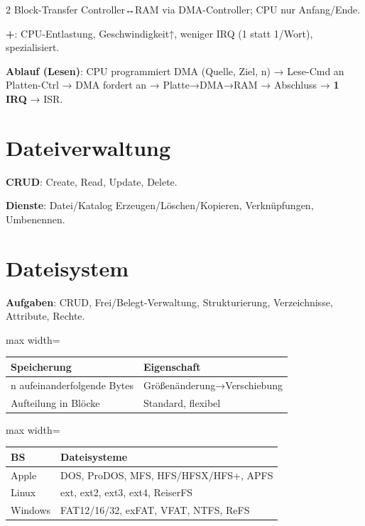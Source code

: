 \documentclass[10pt, a4paper]{article}
\begin{document}
\begin{multicols}{2}
Block-Transfer Controller↔RAM via DMA-Controller; CPU nur Anfang/Ende.


\textbf{+}: CPU-Entlastung, Geschwindigkeit↑, weniger IRQ (1 statt 1/Wort), spezialisiert.


\textbf{Ablauf (Lesen)}: CPU programmiert DMA (Quelle, Ziel, n) → Lese-Cmd an Platten-Ctrl → DMA fordert an → Platte→DMA→RAM → Abschluss → \textbf{1 IRQ} → ISR.



\section{Dateiverwaltung}

\textbf{CRUD}: Create, Read, Update, Delete.


\textbf{Dienste}: Datei/Katalog Erzeugen/Löschen/Kopieren, Verknüpfungen, Umbenennen.



\section{Dateisystem}

\textbf{Aufgaben}: CRUD, Frei/Belegt-Verwaltung, Strukturierung, Verzeichnisse, Attribute, Rechte.



{\small
\begin{adjustbox}{max width=\linewidth}
{\scriptsize
\begin{tabular}{ll}
\toprule
\textbf{Speicherung} & \textbf{Eigenschaft} \\
\midrule
n aufeinanderfolgende Bytes & Größenänderung→Verschiebung \\
Aufteilung in Blöcke & Standard, flexibel \\
\bottomrule
\end{tabular}
}
\end{adjustbox}
}



{\small
\begin{adjustbox}{max width=\linewidth}
{\scriptsize
\begin{tabular}{ll}
\toprule
\textbf{BS} & \textbf{Dateisysteme} \\
\midrule
Apple & DOS, ProDOS, MFS, HFS/HFSX/HFS+, APFS \\
Linux & ext, ext2, ext3, ext4, ReiserFS \\
Windows & FAT12/16/32, exFAT, VFAT, NTFS, ReFS \\
\bottomrule
\end{tabular}
}
\end{adjustbox}
}




\end{multicols}
\end{document}
